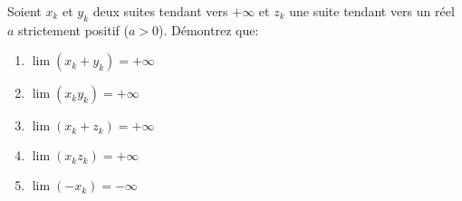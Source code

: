 
\begin{exercice}\label{exo0010}

Soient $x_k$ et $y_k$ deux suites tendant vers $+\infty $ et $z_k$ une suite tendant vers un réel $a$ strictement positif ($a >0$).  Démontrez que:
\begin{enumerate}
	\item  $\lim (x_k + y_k) = +\infty $
	\item  $\lim(x_k y_k) = +\infty$
	\item  $\lim(x_k + z_k) = +\infty $
	\item  $\lim(x_k z_k) = +\infty$
	\item  $\lim (-x_k) = - \infty $
\end{enumerate}

\end{exercice}
